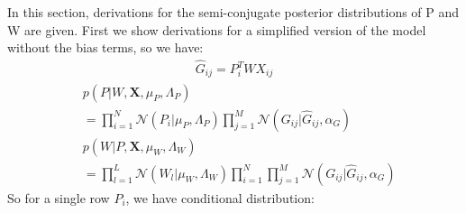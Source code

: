 \documentclass[10pt]{proc}
\begin{document}
In this section, derivations for the semi-conjugate posterior distributions of P
and W are given. First we show derivations for a simplified version of the model
without the bias terms, so we have:
%
\begin{align}
    \hat{G}_{ij} = P_i^T W X_{ij}
\end{align}
%
\begin{align}
    &p(P | W, \bm{X}, \mu_P, \Lambda_P)  \\
        \nonumber
        &= \prod_{i=1}^N \mathcal{N}(P_i | \mu_P, \Lambda_P)
           \prod_{j=1}^M \mathcal{N}(G_{ij} | \hat{G}_{ij}, \alpha_G) \\
%
    &p(W | P, \bm{X}, \mu_W, \Lambda_W)  \\
        \nonumber
        &=  \prod_{l=1}^L\mathcal{N}(W_l | \mu_W, \Lambda_W)
            \prod_{i=1}^N \prod_{j=1}^M
                \mathcal{N}(G_{ij} | \hat{G}_{ij}, \alpha_G)
\end{align}
%
So for a single row $P_i$, we have conditional distribution:
%
\end{document}
